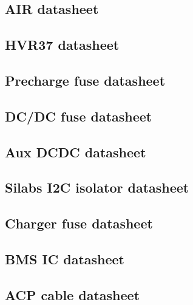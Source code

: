 \subsection{AIR datasheet}\label{app:air_datasheet}
	
	
\subsection{HVR37 datasheet}\label{app:hvr37_datasheet}
	
	
\subsection{Precharge fuse datasheet}\label{app:precharge_fuse_datasheet}
	

\subsection{DC/DC fuse datasheet}\label{app:dcdc_fuse_datasheet}
	

\subsection{Aux DCDC datasheet}\label{app:aux_dcdc_datasheet}
	

\subsection{Silabs I2C isolator datasheet}\label{app:ecua_isloator_datasheet}
	
	
\subsection{Charger fuse datasheet}\label{app:charger_fuse_datasheet}
	
	
\subsection{BMS IC datasheet}\label{app:bms_datasheet}
	

\subsection{ACP cable datasheet}\label{app:PowerConductor}
	




\label{app:XT60connector}
